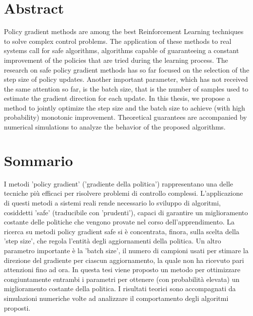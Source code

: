 
\begingroup
\let\clearpage\relax
\let\cleardoublepage\relax
\let\cleardoublepage\relax

\chapter*{Abstract}
Policy gradient methods are among the best Reinforcement Learning techniques to solve complex control problems. The application of these methods to real systems call for safe algorithms, \ie algorithms capable of guaranteeing a constant improvement of the policies that are tried during the learning process. The research on safe policy gradient methods has so far focused on the selection of the step size of policy updates. Another important parameter, which has not received the same attention so far, is the batch size, that is the number of samples used to estimate the gradient direction for each update. In this thesis, we propose a method to jointly optimize the step size and the batch size to achieve (with high probability) monotonic improvement. Theoretical guarantees are accompanied by numerical simulations to analyze the behavior of the proposed algorithms.  

\vfill
\newpage
{}
\chapter*{Sommario}
I metodi 'policy gradient' ('gradiente della politica') rappresentano una delle tecniche più efficaci per risolvere problemi di controllo complessi. L'applicazione di questi metodi a sistemi reali rende necessario lo sviluppo di algoritmi, cosiddetti 'safe' (traducibile con 'prudenti'), capaci di garantire un miglioramento costante delle politiche che vengono provate nel corso dell'apprendimento. La ricerca su metodi policy gradient safe si è concentrata, finora, sulla scelta della 'step size', che regola l'entità degli aggiornamenti della politica. Un altro parametro importante è la 'batch size', il numero di campioni usati per stimare la direzione del gradiente per ciascun aggiornamento, la quale non ha ricevuto pari attenzioni fino ad ora. In questa tesi viene proposto un metodo per ottimizzare congiuntamente entrambi i parametri per ottenere (con probabilità elevata) un miglioramento costante della politica. I risultati teorici sono accompagnati da simulazioni numeriche volte ad analizzare il comportamento degli algoritmi proposti.

\endgroup